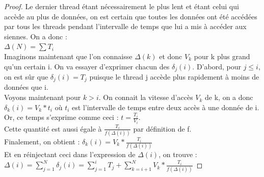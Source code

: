 \documentclass{report}
\begin{document}
\begin{proof}
  Le dernier thread étant nécessairement le plus lent et étant celui qui accède au plus de données,
  on est certain que toutes les données ont été accédées par tous les threads pendant l'intervalle
  de temps que lui a mis à accéder aux siennes. On a donc :
  \\$\Delta(N) = \sum{T_i}$
  \\Imaginons maintenant que l'on connaisse $\Delta(k)$ et donc $V_k$ pour k plus grand qu'un certain i.
  On va essayer d'exprimer chacun des $\delta_j(i)$. D'abord, pour $j \leq i$, on est sûr que 
  $\delta_j(i) = T_j$ puisque le thread j accède plus rapidement à moins de données que i. 
  \\Voyons maintenant pour $k > i$. On connait la vitesse d'accès $V_k$ de k, on a donc
  $\delta_k(i) = V_k * t_i $ où $t_i$ est l'intervalle de temps entre deux accès à une donnée de i.
  Or, ce temps s'exprime comme ceci : $t = \frac{T_i}{V_i} $.
  \\ Cette quantité est aussi égale à $\frac{T_i}{f(\Delta(i))}$ par définition de f.
  \\Finalement, on obtient : 
  $\delta_k(i) = V_k * \frac{T_i}{f(\Delta(i))}$
\\ Et en réinjectant ceci dans l'expression de $\Delta(i)$, on trouve : 
\\  $\Delta(i) = \sum_{j=1}^{N}{\delta_j(i)} = \sum_{j=1}^{i}{T_j} + \sum_{k=i+1}^{N}{V_k} * \frac{T_i}{f(\Delta(i))}$
\end{proof}
\end{document}

